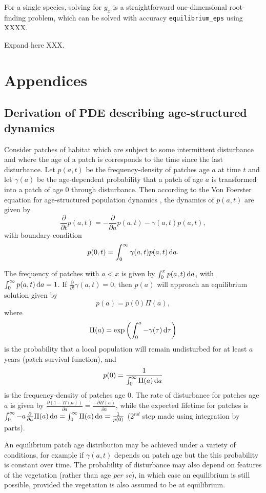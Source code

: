 \documentclass[10pt,twoside]{article}
\begin{document}
For a single species, solving for \(y_x\) is a straightforward
one-dimensional root-finding problem, which can be solved with accuracy
\texttt{equilibrium\_eps} using XXXX.

Expand here XXX.

\section{Appendices}\label{appendices}

\subsection{Derivation of PDE describing age-structured
dynamics}\label{derivation-of-pde-describing-age-structured-dynamics}

Consider patches of habitat which are subject to some intermittent
disturbance and where the age of a patch is corresponds to the time
since the last disturbance. Let \(p(a,t)\) be the frequency-density of
patches age \(a\) at time \(t\) and let \(\gamma(a)\) be the
age-dependent probability that a patch of age \(a\) is transformed into
a patch of age \(0\) through disturbance. Then according to the Von
Foerster equation for age-structured population dynamics
\citep{Vonfoerster-1959}, the dynamics of \(p(a,t)\) are given by
\[ \frac{\partial }{\partial t} p(a,t)=-\frac{\partial }{\partial a} p(a,t)-\gamma(a,t)p(a,t),\]
with boundary condition
\[ p(0,t)=\int^{\infty}_{0}\gamma(a,t)p(a,t)\,{\rm d}a.\]

The frequency of patches with \(a < x\) is given by
\(\int_{0}^{x}p(a,t) \, {\rm d}a\), with
\(\int_{0}^{\infty} p(a,t) \, {\rm d}a =1\). If
\(\frac{\partial}{\partial t}\gamma(a,t)=0\), then \(p(a)\) will
approach an equilibrium solution given by \[p(a) = p(0) \Pi(a),\] where
\[\Pi(a) = \exp \left( \int_{0}^{a}-\gamma(\tau)\,{\rm d}\tau\right)\]
is the probability that a local population will remain undisturbed for
at least \(a\) years (patch survival function), and
\[p(0) = \frac1{ \int_{0}^{\infty}\Pi(a) \,{\rm d}a}\] is the
frequency-density of patches age 0. The rate of disturbance for patches
age \(a\) is given by
\(\frac{\partial (1-\Pi(a))}{\partial a} = \frac{-\partial \Pi(a)}{\partial a}\),
while the expected lifetime for patches is
\(\int_0^\infty - a \frac{\partial}{\partial a} \Pi(a) \, {\rm d} a = \int_0^\infty \Pi(a) \, {\rm d} a = \frac1{p(0)}\)
(2\(^{nd}\) step made using integration by parts).

An equilibrium patch age distribution may be achieved under a variety of
conditions, for example if \(\gamma(a,t)\) depends on patch age but the
this probability is constant over time. The probability of disturbance
may also depend on features of the vegetation (rather than age \emph{per
se}), in which case an equilibrium is still possible, provided the
vegetation is also assumed to be at equilibrium.
\end{document}
